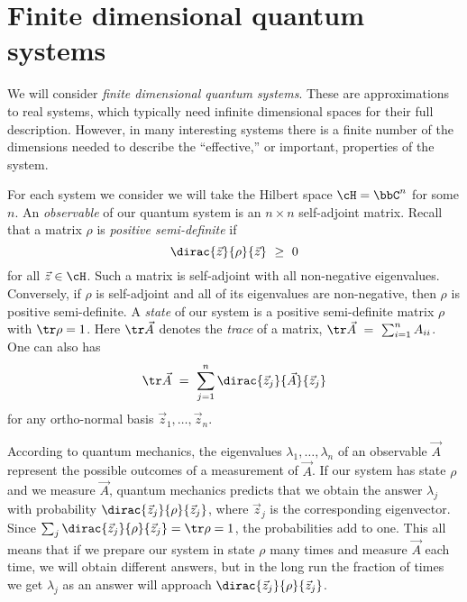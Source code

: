 \documentclass[12pt]{amsart}
\numberwithin{equation}{section}
\numberwithin{figure}{section}
\theoremstyle{theorem}
\begin{document}
	\section{Finite dimensional quantum systems} 
	We will 
	consider \emph{finite dimensional quantum systems}.  These are 
	approximations to real systems, which typically need infinite dimensional 
	spaces for their full description.  However, in many interesting systems 
	there is a finite number of the dimensions needed to describe the 
	``effective,'' or important, properties of the system.
	
	For each system we consider we will take the Hilbert space $\cH=\bbC^n$ for 
	some $n$. An \emph{observable} of our quantum system is an $n\times n$ 
	self-adjoint matrix.   Recall that a matrix $\rho$ is \emph{positive 
	semi-definite} if
	\begin{equation}\label{eq:psd}
		\dirac{\vec{z}}{\rho}{\vec{z}} \ \ge \ 0 
	\end{equation}
for all $\vec{z}\in \cH$.  Such a matrix is self-adjoint with all non-negative 
eigenvalues.  Conversely, if $\rho$ is self-adjoint and all of its eigenvalues 
are non-negative, then $\rho$ is positive semi-definite. 
	A \emph{state} of our system is a positive semi-definite matrix $\rho$ with 
	$\tr \rho =1$.  Here $\tr \vec{A}$ denotes the \emph{trace} of a matrix, 
	$\tr\vec{A} \ = \ \sum_{i=1}^n A_{ii}$.  One can also has
	$$\tr \vec{A} \ = \ \sum_{j=1}^n \dirac{\vec{z}_j}{\vec{A}}{\vec{z}_j}$$
	for any ortho-normal basis $\vec{z}_1,\ldots,\vec{z}_n$.
	
	According to quantum mechanics, the eigenvalues 
	$\lambda_1,\ldots,\lambda_n$ of an observable $\vec{A}$ represent the 
	possible outcomes of a measurement of $\vec{A}$. If our system has state 
	$\rho$ and we measure $\vec{A}$, quantum mechanics predicts that we obtain 
	the answer $\lambda_j$ with probability 
	$\dirac{\vec{z}_j}{\rho}{\vec{z}_j}$, where $\vec{z}_j$ is the 
	corresponding eigenvector. Since $\sum_j \dirac{\vec{z}_j}{\rho}{\vec{z}_j} 
	= \tr \rho = 1$, the probabilities add to one.  This all means that if we 
	prepare our system in state $\rho$ many times and measure $\vec{A}$ each 
	time, we will obtain different answers, but in the long run the fraction of 
	times we get $\lambda_j$ as an answer will approach 
	$\dirac{\vec{z}_j}{\rho}{\vec{z}_j}$. 
		
	
\end{document}
